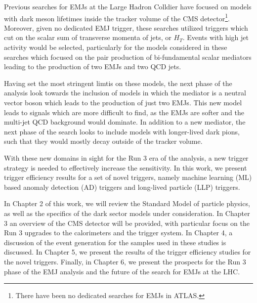 Previous searches for EMJs at the Large Hadron Colldier have focused on models with dark meson lifetimes inside the tracker volume of the CMS detector\footnote{There have been no dedicated searches for EMJs in ATLAS.}. Moreover, given no dedicated EMJ trigger, these searches utilized triggers which cut on the scalar sum of transverse momenta of jets, or $H_T$. Events with high jet activity would be selected, particularly for the models considered in these searches which focused on the pair production of bi-fundamental scalar mediators leading to the production of two EMJs and two QCD jets.

Having set the most stringent limtis on these models, the next phase of the analysis look towards the inclusion of models in which the mediator is a neutral vector boson which leads to the production of just two EMJs. This new model leads to signals which are more difficult to find, as the EMJs are softer and the multi-jet QCD background would dominate. In addition to a new mediator, the next phase of the search looks to include models with longer-lived dark pions, such that they would mostly decay outside of the tracker volume.

With these new domains in sight for the Run 3 era of the analysis, a new trigger strategy is needed to effectively increase the sensitivity. In this work, we present trigger efficiency results for a set of novel triggers, namely machine learning (ML) based anomaly detection (AD) triggers and long-lived particle (LLP) triggers.

In Chapter 2 of this work, we will review the Standard Model of particle physics, as well as the specifics of the dark sector models under consideration. In Chapter 3 an overview of the CMS detector will be provided, with particular focus on the Run 3 upgrades to the calorimeters and the trigger system. In Chapter 4, a discussion of the event generation for the samples used in these studies is discussed. In Chapter 5, we present the results of the trigger efficiency studies for the novel triggers. Finally, in Chapter 6, we present the prospects for the Run 3 phase of the EMJ analysis and the future of the search for EMJs at the LHC.



